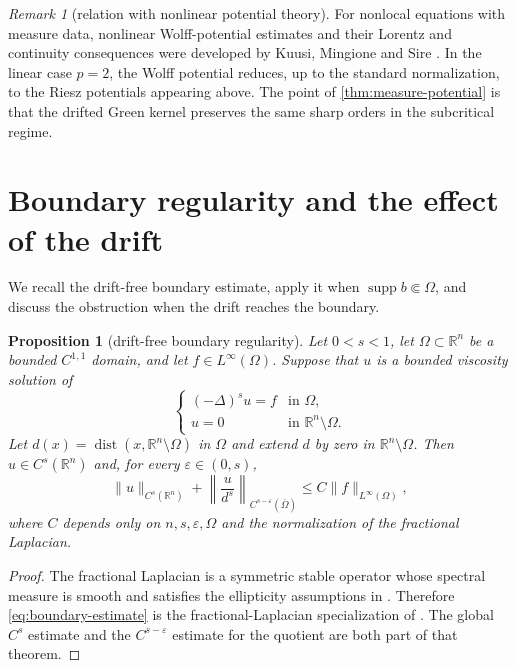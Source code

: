 \documentclass[reqno]{amsart}
\numberwithin{equation}{section}
\theoremstyle{plain}
\newtheorem{proposition}[theorem]{Proposition}
\theoremstyle{definition}
\theoremstyle{remark}
\newtheorem{remark}[theorem]{Remark}
\newcommand{\R}{\mathbb R}
\newcommand{\rev}[1]{#1}
\begin{document}
\begin{remark}[relation with nonlinear potential theory]
For nonlocal equations with measure data, nonlinear Wolff-potential
estimates and their Lorentz and continuity consequences were developed by
Kuusi, Mingione and Sire \cite{KuusiMingioneSire2015}.  In the linear case
$p=2$, the Wolff potential reduces, up to the standard normalization, to the
Riesz potentials appearing above.  The point of
\cref{thm:measure-potential} is that the drifted Green kernel preserves the
same sharp orders in the subcritical regime.
\end{remark}

\section{Boundary regularity and the effect of the drift}
\label{sec:boundary}

\rev{We recall the drift-free boundary estimate, apply it when
$\operatorname{supp}b\Subset\Omega$, and discuss the obstruction when the
drift reaches the boundary.}

\begin{proposition}[drift-free boundary regularity]\label{prop:boundary-base}
Let $0<s<1$, let $\Omega\subset\R^n$ be a bounded $C^{1,1}$ domain, and let
$f\in L^\infty(\Omega)$.  Suppose that $u$ is a bounded viscosity solution of
\begin{equation}\label{eq:dirichlet-pure}
 \begin{cases}
 (-\Delta)^su=f&\text{in }\Omega,\\
 u=0&\text{in }\R^n\setminus\Omega.
 \end{cases}
\end{equation}
Let $d(x)=\operatorname{dist}(x,\R^n\setminus\Omega)$ in $\Omega$ and extend
$d$ by zero in $\R^n\setminus\Omega$.  Then $u\in C^s(\R^n)$ and, for every
$\varepsilon\in(0,s)$,
\begin{equation}\label{eq:boundary-estimate}
 \|u\|_{C^s(\R^n)}
 +\left\|\frac{u}{d^s}\right\|_{C^{s-\varepsilon}(\overline\Omega)}
 \le C\|f\|_{L^\infty(\Omega)},
\end{equation}
where $C$ depends only on $n,s,\varepsilon,\Omega$ and the normalization of
the fractional Laplacian.
\end{proposition}

\begin{proof}
The fractional Laplacian is a symmetric stable operator whose spectral
measure is smooth and satisfies the ellipticity assumptions in
\cite{RosOtonSerra2016}.  Therefore \eqref{eq:boundary-estimate} is
the fractional-Laplacian specialization of
\cite[Theorem~1.2]{RosOtonSerra2016}.  The global $C^s$ estimate and the
$C^{s-\varepsilon}$ estimate for the quotient are both part of that theorem.
\end{proof}
\end{document}
